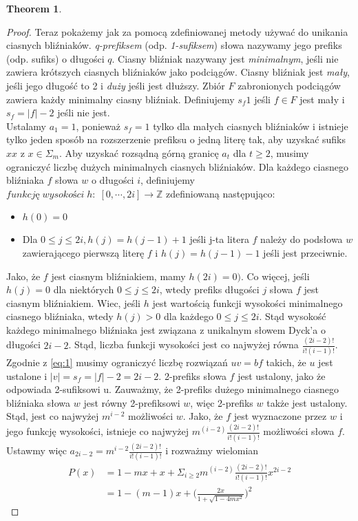 \documentclass[11pt,a4paper]{article}
\theoremstyle{definition}
\newtheorem{theorem}{Theorem}[section]
\begin{document}
\begin{theorem}
\begin{proof}
Teraz pokażemy jak za pomocą zdefiniowanej metody używać do unikania ciasnych bliźniaków. \textit{q-prefiksem} (odp. \textit{1-sufiksem}) słowa nazywamy jego prefiks (odp. sufiks) o długości $q$. Ciasny bliźniak nazywany jest \textit{minimalnym}, jeśli nie zawiera krótszych ciasnych bliźniaków jako podciągów. Ciasny bliźniak jest \textit{mały}, jeśli jego długość to 2 i \textit{duży} jeśli jest dłuższy. Zbiór $F$ zabronionych podciągów zawiera każdy minimalny ciasny bliźniak. Definiujemy $s_f 1$ jeśli $f \in F$ jest mały i $s_f = |f| - 2$ jeśli nie jest.
\\
Ustalamy $a_1 = 1$, ponieważ $s_f=1$ tylko dla małych ciasnych bliźniaków i istnieje tylko jeden sposób na rozszerzenie prefiksu o jedną literę tak, aby uzyskać sufiks $xx$ z $x \in \Sigma_m$. Aby uzyskać rozsądną górną granicę $a_t$ dla $t \geq 2$, musimy ograniczyć liczbę dużych minimalnych ciasnych bliźniaków. Dla każdego ciasnego bliźniaka $f$ słowa $w$ o długości $i$, definiujemy $funkcję \; wysokości \; h: \; [0,\cdots,2i] \rightarrow \mathbb{Z}$ zdefiniowaną następująco:
\begin{itemize}
\item $h(0) = 0$
\item Dla $0\leq j \leq 2i, h(j) = h(j-1) + 1$ jeśli j-ta litera $f$ należy do podsłowa $w$ zawierającego pierwszą literę $f$ i $h(j) = h(j-1) -1$ jeśli jest przeciwnie.
\end{itemize}

Jako, że $f$ jest ciasnym bliźniakiem, mamy $h(2i) = 0)$. Co więcej, jeśli $h(j) = 0$ dla niektórych $0 \leq j \leq 2i$, wtedy prefiks długości $j$ słowa $f$ jest ciasnym bliźniakiem. Wiec, jeśli $h$ jest wartością funkcji wysokości minimalnego ciasnego bliźniaka, wtedy $h(j)>0$ dla każdego $0 \leq j \leq 2i$. Stąd wysokość każdego minimalnego bliźniaka jest związana z unikalnym słowem Dyck'a o długości $2i-2$. Stąd, liczba funkcji wysokości jest co najwyżej równa $\frac{(2i - 2)!}{i!(i-1)!}$. Zgodnie z \autoref{eq:1} musimy ograniczyć liczbę rozwiązań $uv=bf$ takich, że $u$ jest ustalone i $|v| = s_f = |f| -2 = 2i - 2$. 2-prefiks słowa $f$ jest ustalony, jako że odpowiada 2-sufiksowi u. Zauważmy, że 2-prefiks dużego minimalnego ciasnego bliźniaka słowa $w$ jest równy 2-prefiksowi $w$, więc 2-prefiks $w$ także jest ustalony. Stąd, jest co najwyżej $m^{i-2}$ możliwości $w$. Jako, że $f$ jest wyznaczone przez $w$ i jego funkcję wysokości, istnieje co najwyżej $m^(i-2)\frac{(2i - 2)!}{i!(i-1)!}$ możliwości słowa $f$. Ustawmy więc $a_{2i-2} = m^{i-2}\frac{(2i - 2)!}{i!(i-1)!}$ i rozważmy wielomian
\begin{equation}
\begin{split}
P(x) & = 1 - mx + x + \Sigma_{i \geq 2} m^(i-2)\frac{(2i - 2)!}{i!(i-1)!} x^{2i-2} \\
& = 1 - (m-1)x + \Big(\frac{2x}{1+ \sqrt{1-4mx^2}} \Big)^2
\end{split}
\end{equation}


\end{proof}
\end{theorem}
\end{document}
